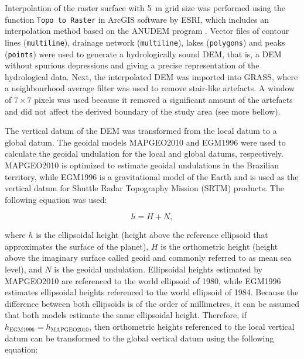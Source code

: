 
Interpolation of the raster surface with \SI{5}{\metre} grid size was performed using the function 
\texttt{Topo to Raster} in ArcGIS\textregistered{} software by ESRI, which includes an interpolation method 
based on the ANUDEM program \cite{Hutchinson1989}. Vector files of contour lines (\texttt{multiline}), 
drainage network (\texttt{multiline}), lakes (\texttt{polygons}) and peaks (\texttt{points}) were used to 
generate a hydrologically sound DEM, that is, a DEM without spurious depressions and giving a precise 
representation of the hydrological data. Next, the interpolated DEM was imported into GRASS, where a 
neighbourhood average filter was used to remove stair-like artefacts. A window of $7 \times 7$ pixels was used 
because it removed a significant amount of the artefacts and did not affect the derived boundary of the study 
area (see more bellow).

The vertical datum of the DEM was transformed from the local datum to a global datum. The geoidal models 
MAPGEO2010 \cite{IBGE2010a} and EGM1996 \cite{LemoineEtAl1998} were used to calculate the geoidal undulation 
for the local and global datums, respectively. MAPGEO2010 is optimized to estimate geoidal undulations in the 
Brazilian territory, while EGM1996 is a gravitational model of the Earth and is used as the vertical datum for 
Shuttle Radar Topography Mission (SRTM) products. The following equation was used:

\begin{equation}\label{eqn:geoidal}
 h = H + N,
\end{equation}

\noindent where $h$ is the ellipsoidal height (height above the reference ellipsoid that approximates the 
surface of the planet), $H$ is the orthometric height (height above the imaginary surface called geoid and 
commonly referred to as mean sea level), and $N$ is the geoidal undulation. Ellipsoidal heights estimated by 
MAPGEO2010 are referenced to the world ellipsoid of 1980, while EGM1996 estimates ellipsoidal heights 
referenced to the world ellipsoid of 1984. Because the difference between both ellipsoids is of the order of 
millimetres, it can be assumed that both models estimate the same ellipsoidal height. Therefore, if 
$h_{\text{EGM1996}} = h_{\text{MAPGEO2010}}$, then orthometric heights referenced to the local vertical datum 
can be transformed to the global vertical datum using the following equation:

